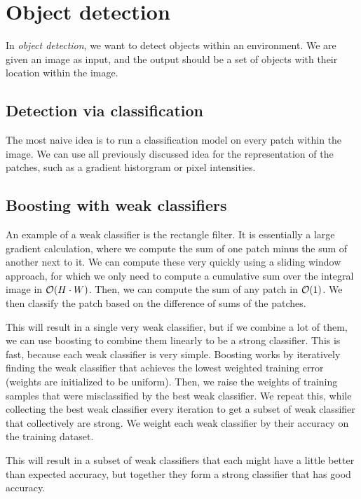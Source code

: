 \section{Object detection}

In \textit{object detection}, we want to detect objects within an environment.
We are given an image as input, and the output should be a set of objects with
their location within the image.

\subsection{Detection via classification}

The most naive idea is to run a classification model on every patch within the
image. We can use all previously discussed idea for the representation of the
patches, such as a gradient historgram or pixel intensities.

\subsection{Boosting with weak classifiers}

An example of a weak classifier is the rectangle filter. It is essentially a
large gradient calculation, where we compute the sum of one patch minus the sum
of another next to it. We can compute these very quickly using a sliding window
approach, for which we only need to compute a cumulative sum over the integral
image in $\bigo{H\cdot W}$. Then, we can compute the sum of any patch in
$\bigo{1}$. We then classify the patch based on the difference of sums of the
patches.

This will result in a single very weak classifier, but if we combine a lot of
them, we can use boosting to combine them linearly to be a strong classifier.
This is fast, because each weak classifier is very simple. Boosting works by
iteratively finding the weak classifier that achieves the lowest weighted
training error (weights are initialized to be uniform). Then, we raise the
weights of training samples that were misclassified by the best weak
classifier. We repeat this, while collecting the best weak classifier every
iteration to get a subset of weak classifier that collectively are strong. We
weight each weak classifier by their accuracy on the training dataset.

This will result in a subset of weak classifiers that each might have a little
better than expected accuracy, but together they form a strong classifier that
has good accuracy.

